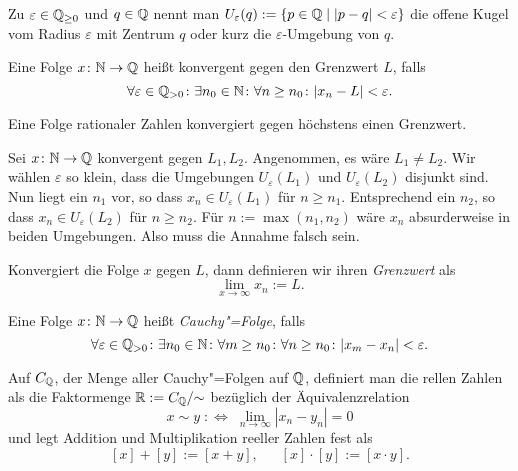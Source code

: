 \begin{Definition}\newlinefirst
Zu $\varepsilon\in\mathbb Q_{\ge 0}$ und $q\in\mathbb Q$ nennt man $U_\varepsilon(q):=\{p\in\mathbb Q\mid |p-q|<\varepsilon\}$
die offene Kugel vom Radius $\varepsilon$ mit Zentrum $q$ oder kurz die $\varepsilon$-Umgebung von $q$.
\end{Definition}

\begin{Definition}\newlinefirst
Eine Folge $x\colon\mathbb N\to\mathbb Q$ heißt konvergent gegen den Grenzwert $L$, falls
\[\forall\varepsilon\in\mathbb Q_{>0}\colon\exists n_0\in\mathbb N\colon\forall n\ge n_0\colon |x_n-L| < \varepsilon.\]
\end{Definition}

\begin{Satz}
Eine Folge rationaler Zahlen konvergiert gegen höchstens einen Grenzwert.
\end{Satz}
\begin{Beweis}
Sei $x\colon\mathbb N\to\mathbb Q$ konvergent gegen $L_1,L_2$. Angenommen, es wäre $L_1\ne L_2$.
Wir wählen $\varepsilon$ so klein, dass die Umgebungen $U_\varepsilon(L_1)$
und $U_\varepsilon(L_2)$ disjunkt sind. Nun liegt ein $n_1$ vor,
so dass $x_n\in U_\varepsilon(L_1)$ für $n\ge n_1$. Entsprechend ein
$n_2$, so dass $x_n\in U_\varepsilon(L_2)$ für $n\ge n_2$. Für
$n:=\max(n_1,n_2)$ wäre $x_n$ absurderweise in beiden Umgebungen.
Also muss die Annahme falsch sein.\,\qedsymbol
\end{Beweis}

\begin{Definition}[Grenzwert]\newlinefirst
Konvergiert die Folge $x$ gegen $L$, dann definieren wir ihren \emph{Grenzwert} als
\[\lim_{x\to\infty} x_n := L.\]
\end{Definition}

\begin{Definition}\newlinefirst
Eine Folge $x\colon\mathbb N\to\mathbb Q$ heißt \emph{Cauchy"=Folge}, falls
\[\forall\varepsilon\in\mathbb Q_{>0}\colon\exists n_0\in\mathbb N\colon
\forall m\ge n_0\colon\forall n\ge n_0\colon |x_m - x_n| < \varepsilon.\]
\end{Definition}

\begin{Definition}\newlinefirst
Auf $C_\mathbb Q$, der Menge aller Cauchy"=Folgen auf $\mathbb Q$, definiert man
die rellen Zahlen als die Faktormenge $\mathbb R:=C_\mathbb Q/{\sim}$ bezüglich
der Äquivalenzrelation
\[x\sim y \;:\Leftrightarrow\; \lim_{n\to\infty}|x_n-y_n| = 0\]
und legt Addition und Multiplikation reeller Zahlen fest als
\[[x]+[y] := [x+y],\quad\;\; [x]\cdot [y] := [x\cdot y].\]
\end{Definition}
